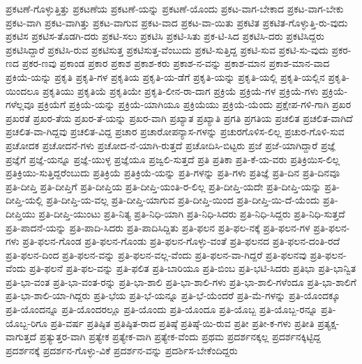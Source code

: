 {ಪ್ರಕಟಣೆ-ಗೊಳ್ಳುತ್ತಿತ್ತು
ಪ್ರಕಟಣೆಯ
ಪ್ರಕಟಣೆ-ಯನ್ನು
ಪ್ರಕಟಣೆ-ಯೊಂದು
ಪ್ರಕಟ-ವಾಗ-ಬೇಕಾದ
ಪ್ರಕಟ-ವಾಗ-ಬೇಕು
ಪ್ರಕಟ-ವಾಗಿ
ಪ್ರಕಟ-ವಾಗಿತ್ತು
ಪ್ರಕಟ-ವಾಗುವ
ಪ್ರಕಟ-ವಾದ
ಪ್ರಕಟ-ವಾ-ಯಿತು
ಪ್ರಕಟಿತ
ಪ್ರಕಟಿತ-ಗೊಳ್ಳುತ್ತಿ-ರು-ವುದು
ಪ್ರಕಟಿಸ
ಪ್ರಕಟಿಸ-ತೊಡಗಿ-ದರು
ಪ್ರಕಟಿ-ಸಲು
ಪ್ರಕಟಿಸಿ
ಪ್ರಕಟಿ-ಸಿತು
ಪ್ರಕ-ಟಿ-ಸಿದ
ಪ್ರಕಟಿಸಿ-ದರು
ಪ್ರಕಟಿಸಿದ್ದರು
ಪ್ರಕಟಿಸಿದ್ದಾರೆ
ಪ್ರಕಟಿಸಿ-ರುವ
ಪ್ರಕಟಿಸುತ್ತ
ಪ್ರಕಟಿಸುತ್ತ-ವೆಂಬುದು
ಪ್ರಕಟಿ-ಸುತ್ತಿದ್ದ
ಪ್ರಕಟಿ-ಸುವ
ಪ್ರಕಟಿ-ಸು-ವುದು
ಪ್ರಕರ-ಣದ
ಪ್ರಕರ-ಣವು
ಪ್ರಕಾಂಡ
ಪ್ರಕಾರ
ಪ್ರಕಾಶ
ಪ್ರಕಾಶ-ಕರು
ಪ್ರಕಾಶ-ನ-ವನ್ನು
ಪ್ರಕಾಶ-ಮಾನ
ಪ್ರಕಾಶ-ಮಾನ-ವಾದ
ಪ್ರಕಿಯೆ-ಯನ್ನು
ಪ್ರಕೃತಿ
ಪ್ರಕೃತಿ-ಗಳ
ಪ್ರಕೃತಿಯ
ಪ್ರಕೃತಿ-ಯ-ಡೆಗೆ
ಪ್ರಕೃತಿ-ಯನ್ನು
ಪ್ರಕೃತಿ-ಯಲ್ಲಿ
ಪ್ರಕೃತಿ-ಯಲ್ಲಿನ
ಪ್ರಕೃತಿ-ಯಿಂದಲೂ
ಪ್ರಕೃತಿಯು
ಪ್ರಕೃತಿಯೆ
ಪ್ರಕೃತಿಯೇ
ಪ್ರಕೃತಿ-ಲೀನ-ರಾ-ದಾಗ
ಪ್ರಕ್ರಿಯೆ
ಪ್ರಕ್ರಿಯೆ-ಗಳ
ಪ್ರಕ್ರಿಯೆ-ಗಳು
ಪ್ರಕ್ರಿಯೆ-ಗಳೆಲ್ಲವೂ
ಪ್ರಕ್ರಿಯೆಗೆ
ಪ್ರಕ್ರಿಯೆ-ಯನ್ನು
ಪ್ರಕ್ರಿಯೆ-ಯಾಗಿಯೂ
ಪ್ರಕ್ರಿಯೆಯು
ಪ್ರಕ್ರಿಯೆ-ಯೆಂದು
ಪ್ರಕ್ಷೇಪ-ಗಳಿ-ಗಾಗಿ
ಪ್ರಖರ
ಪ್ರಖರತೆ
ಪ್ರಖರ-ತೆಯ
ಪ್ರಖರ-ತೆ-ಯನ್ನು
ಪ್ರಖರ-ವಾಗಿ
ಪ್ರಖ್ಯಾತ
ಪ್ರಖ್ಯಾತಿ
ಪ್ರಗತಿ
ಪ್ರಗತಿಯ
ಪ್ರಚಲಿತ
ಪ್ರಚಲಿತ-ವಾಗಿದೆ
ಪ್ರಚಲಿತ-ವಾ-ಗಿದ್ದವು
ಪ್ರಚಲಿತ-ವಿದ್ದ
ಪ್ರಚಾರ
ಪ್ರಚಾರೋಪನ್ಯಾಸ-ಗಳನ್ನು
ಪ್ರಚುರಗೊಳಿಸ-ಲಿಲ್ಲ
ಪ್ರಚುರ-ಗೊಳಿ-ಸುವ
ಪ್ರಚೋದಕ
ಪ್ರಚೋದನೆ-ಗಳು
ಪ್ರಚೋದ-ನೆ-ಯಾಗಿ-ರುತ್ತದೆ
ಪ್ರಚೋದಿಸಿ-ಬಿಟ್ಟರು
ಪ್ರಜೆ
ಪ್ರಜೆ-ಯಾಗಿದ್ದಾರೆ
ಪ್ರಜ್ಞೆ
ಪ್ರಜ್ಞೆಗೆ
ಪ್ರಜ್ಞೆ-ಯನ್ನೂ
ಪ್ರಜ್ಞೆ-ಯುಳ್ಳ
ಪ್ರಜ್ಞೆಯೂ
ಪ್ರಜ್ವಲಿ-ಸುತ್ತದೆ
ಪ್ರತಿ
ಪ್ರತಿಕಾ
ಪ್ರತಿ-ಕೆ-ಯ-ವರು
ಪ್ರತಿಕ್ರಿಯಿಸ-ಲಿಲ್ಲ
ಪ್ರತಿಕ್ರಿಯು-ಸುತ್ತಿದ್ದರೆಂಬುದು
ಪ್ರತಿಕ್ರಿಯೆ
ಪ್ರತಿಕ್ರಿಯೆ-ಯನ್ನು
ಪ್ರತಿ-ಗಳನ್ನು
ಪ್ರತಿ-ಗಳು
ಪ್ರತಿಜ್ಞೆ
ಪ್ರತಿ-ದಿನ
ಪ್ರತಿ-ದಿನವೂ
ಪ್ರತಿ-ದೀಪ್ತಿ
ಪ್ರತಿ-ದೀಪ್ತಿಗೆ
ಪ್ರತಿ-ದೀಪ್ತಿಯ
ಪ್ರತಿ-ದೀಪ್ತಿ-ಯಂತಿ-ರ-ಲಿಲ್ಲ
ಪ್ರತಿ-ದೀಪ್ತಿ-ಯದೇ
ಪ್ರತಿ-ದೀಪ್ತಿ-ಯನ್ನು
ಪ್ರತಿ-ದೀಪ್ತಿ-ಯಲ್ಲಿ
ಪ್ರತಿ-ದೀಪ್ತಿ-ಯ-ವಲ್ಲ
ಪ್ರತಿ-ದೀಪ್ತಿ-ಯಾಗುವ
ಪ್ರತಿ-ದೀಪ್ತಿ-ಯಿಂದ
ಪ್ರತಿ-ದೀಪ್ತಿ-ಯಿ-ದೆ-ಯೆಂದು
ಪ್ರತಿ-ದೀಪ್ತಿಯು
ಪ್ರತಿ-ದೀಪ್ತಿ-ಯುಂಟು
ಪ್ರತಿ-ನಿತ್ಯ
ಪ್ರತಿ-ನಿಧಿ-ಯಾಗಿ
ಪ್ರತಿ-ನಿಧಿ-ಸಿದರು
ಪ್ರತಿ-ನಿಧಿ-ಸಿದ್ದರು
ಪ್ರತಿ-ನಿಧಿ-ಸುತ್ತದೆ
ಪ್ರತಿ-ಪಾದನೆ-ಯನ್ನು
ಪ್ರತಿ-ಪಾದಿ-ಸಿದರು
ಪ್ರತಿ-ಪಾದಿಸಿದ್ದಿತು
ಪ್ರತಿ-ಫಲನ
ಪ್ರತಿ-ಫಲ-ನಕ್ಕೆ
ಪ್ರತಿ-ಫಲನ-ಗಳ
ಪ್ರತಿ-ಫಲನ-ಗಳು
ಪ್ರತಿ-ಫಲನ-ಗೊಂಡ
ಪ್ರತಿ-ಫಲನ-ಗೊಂಡು
ಪ್ರತಿ-ಫಲನ-ಗೊಳ್ಳು-ವಂತೆ
ಪ್ರತಿ-ಫಲನದ
ಪ್ರತಿ-ಫಲನ-ದಂತಿ-ರದೆ
ಪ್ರತಿ-ಫಲನ-ದಿಂದ
ಪ್ರತಿ-ಫಲನ-ವನ್ನು
ಪ್ರತಿ-ಫಲನ-ವಲ್ಲ-ವೆಂದು
ಪ್ರತಿ-ಫಲನ-ವಾ-ಗಿದ್ದರೆ
ಪ್ರತಿ-ಫಲನವು
ಪ್ರತಿ-ಫಲನ-ವೆಂದು
ಪ್ರತಿ-ಫಲನೆ
ಪ್ರತಿ-ಫಲ-ವನ್ನು
ಪ್ರತಿ-ಫಲಿತ
ಪ್ರತಿ-ಬಾರಿಯೂ
ಪ್ರತಿ-ಬಿಂಬ
ಪ್ರತಿ-ಭಟಿ-ಸಿದರು
ಪ್ರತಿಭಾ
ಪ್ರತಿ-ಭಾನ್ವಿತ
ಪ್ರತಿ-ಭಾ-ವಂತ
ಪ್ರತಿ-ಭಾ-ವಂತ-ರನ್ನು
ಪ್ರತಿ-ಭಾ-ಶಾಲಿ
ಪ್ರತಿ-ಭಾ-ಶಾಲಿ-ಗಳು
ಪ್ರತಿ-ಭಾ-ಶಾಲಿ-ಗಳೆಂದೂ
ಪ್ರತಿ-ಭಾ-ಶಾಲಿಗೆ
ಪ್ರತಿ-ಭಾ-ಶಾಲಿ-ಯಾ-ಗಿದ್ದರು
ಪ್ರತಿ-ಭೆಯ
ಪ್ರತಿ-ಭೆ-ಯನ್ನೂ
ಪ್ರತಿ-ಭೆ-ಯೆಂದರೆ
ಪ್ರತಿ-ಮೆ-ಗಳನ್ನು
ಪ್ರತಿ-ಯೊಂದಕ್ಕೂ
ಪ್ರತಿ-ಯೊಂದನ್ನೂ
ಪ್ರತಿ-ಯೊಂದರಲ್ಲೂ
ಪ್ರತಿ-ಯೊಂದು
ಪ್ರತಿ-ಯೊಂದೂ
ಪ್ರತಿ-ಯೊಬ್ಬ
ಪ್ರತಿ-ಯೊಬ್ಬ-ರನ್ನೂ
ಪ್ರತಿ-ಯೊಬ್ಬ-ರಿಗೂ
ಪ್ರತಿ-ವರ್ಷ
ಪ್ರತಿಷ್ಠಿತ
ಪ್ರತಿಷ್ಠಿತ-ರಾದ
ಪ್ರತಿಷ್ಠೆ
ಪ್ರತಿಷ್ಠೆ-ಯಿ-ರುವ
ಪ್ರತೀ
ಪ್ರತೀ-ಕ-ಗಳು
ಪ್ರತೀತಿ
ಪ್ರತ್ಯಕ್ಷ-ವಾಗುತ್ತದೆ
ಪ್ರತ್ಯುತ್ತರ-ವಾಗಿ
ಪ್ರತ್ಯೇಕ
ಪ್ರತ್ಯೇಕ-ವಾಗಿ
ಪ್ರತ್ಯೇಕ-ವೆಂದು
ಪ್ರಥಮ
ಪ್ರದರ್ಶನಕ್ಕಲ್ಲ
ಪ್ರದರ್ಶನಕ್ಕಿಟ್ಟಿದ್ದ
ಪ್ರದರ್ಶನಕ್ಕೆ
ಪ್ರದರ್ಶನ-ಗೊಳ್ಳು-ವಿಕೆ
ಪ್ರದರ್ಶನ-ವನ್ನು
ಪ್ರದರ್ಶಿಸ-ಬೇಕೆಂದಿದ್ದರು
}
